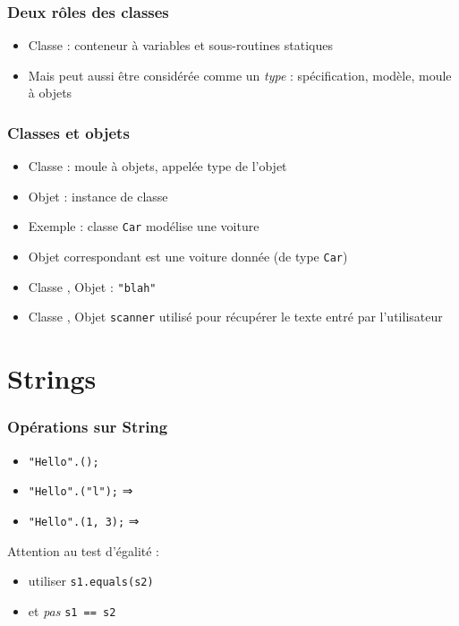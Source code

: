 \documentclass[english, french]{beamer}
\begin{document}
\begin{frame}
	\frametitle{Deux rôles des classes}
	\begin{itemize}
		\item Classe : conteneur à variables et sous-routines statiques
		\item Mais peut aussi être considérée comme un \emph{type} : spécification, modèle, moule à objets
	\end{itemize}
\end{frame}

\begin{frame}
	\frametitle{Classes et objets}
	\begin{itemize}
		\item Classe : moule à objets, appelée type de l’objet
		\item Objet : instance de classe
		\item Exemple : classe \texttt{Car} modélise une voiture
		\item Objet correspondant est une voiture donnée (de type \texttt{Car})
		\item Classe , Objet : \texttt{"blah"}
		\item Classe , Objet \texttt{scanner} utilisé pour récupérer le texte entré par l’utilisateur
	\end{itemize}
\end{frame}

\section{Strings}
\begin{frame}
	\frametitle{Opérations sur String}
	\begin{itemize}
		\item \texttt{"Hello".();}
		\item \texttt{"Hello".("l");} ⇒ \onslide<2->{\texttt{2}}
		\item \texttt{"Hello".(1, 3);} ⇒ \onslide<3>{\texttt{"el"}}
	\end{itemize}
	Attention au test d’égalité :
	\begin{itemize}
		\item[\mkkOK] utiliser \texttt{s1.equals(s2)} 
		\item[\mkkNO] et \emph{pas} \texttt{s1 == s2}
	\end{itemize}
\end{frame}
\end{document}
